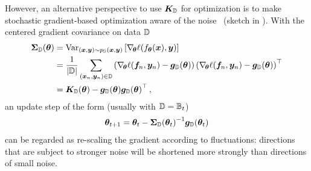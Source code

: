 However, an alternative perspective to use ${\bm{K}}_{{\mathbb{D}}}$ for optimization is to
make stochastic gradient-based optimization aware of the
noise~\cite{balles2022noise} (sketch in
). With the centered gradient covariance
on data ${\mathbb{D}}$
\begin{align}
  \label{eq:background::centeredGradientCovariance}
  \begin{split}
    {\bm{\Sigma}}_{{\mathbb{D}}}({\bm{\theta}})
    &= \mathrm{Var}_{({\bm{x}}, {\bm{y}}) \sim p_{\mathbb{D}}({\bm{x}}, {\bm{y}})}
      \left[
      \nabla_{\!{{\bm{\theta}}}} \ell(f_{{\bm{\theta}}}({\bm{x}}), {\bm{y}})
      \right]
    \\
    &=
      \frac{1}{|{\mathbb{D}}|}
      \sum_{({\bm{x}}_n, {\bm{y}}_n) \in {\mathbb{D}}}
      \left(
      \nabla_{\!{{\bm{\theta}}}} \ell({\bm{f}}_{n}, {\bm{y}}_n) - {\bm{g}}_{{\mathbb{D}}}({\bm{\theta}})
      \right)
      {\left(
      \nabla_{\!{{\bm{\theta}}}} \ell({\bm{f}}_{n}, {\bm{y}}_n) - {\bm{g}}_{{\mathbb{D}}}({\bm{\theta}})
      \right)}^{\top}
    \\
    &=
      {\bm{K}}_{{\mathbb{D}}}({\bm{\theta}})
      -
      {\bm{g}}_{{\mathbb{D}}}({\bm{\theta}})
      {{\bm{g}}_{{\mathbb{D}}}({\bm{\theta}})}^{\top}\,,
  \end{split}
\end{align}
an update step of the form (usually with ${\mathbb{D}} = {\mathbb{B}}_t$)%
\begin{align*}
  {\bm{\theta}}_{t+1}
  =
  {\bm{\theta}}_{t}
  -
  {{\bm{\Sigma}}_{{\mathbb{D}}}({\bm{\theta}}_t)}^{-1}
  {\bm{g}}_{{\mathbb{D}}}({\bm{\theta}}_t)
\end{align*}
can be regarded as re-scaling the gradient according to fluctuations: directions
that are subject to stronger noise will be shortened more strongly than
directions of small noise.

